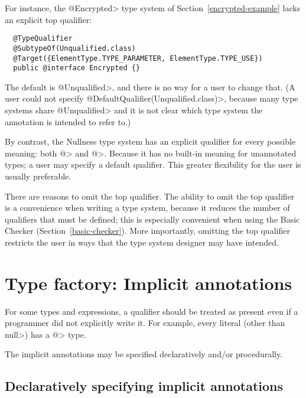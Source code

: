 For instance, the \<@Encrypted> type system of
Section~\ref{encrypted-example} lacks an explicit top qualifier:

\begin{Verbatim}
  @TypeQualifier
  @SubtypeOf(Unqualified.class)
  @Target({ElementType.TYPE_PARAMETER, ElementType.TYPE_USE})
  public @interface Encrypted {}
\end{Verbatim}


\noindent
The default is
\<@Unqualified>, and there is no way for a user to change that.
(A user could not specify \<@DefaultQualifier(Unqualified.class)>,
because many type systems share \<@Unqualified> and it is not clear which
type system the annotation is intended to refer to.)

By contrast, the Nullness type system has an explicit qualifier for every
possible meaning:  both \<@> and
\<@>.  Because it has no built-in meaning
for unannotated types; a user may specify a default qualifier.  This
greater flexibility for the user is usually preferable.

There are reasons to omit the top qualifier.
The ability to omit the top qualifier is a convenience
when writing a type system, because it reduces the number of qualifiers
that must be defined; this is especially convenient when using the Basic
Checker (Section~\ref{basic-checker}).
More importantly, omitting the top qualifier restricts the user in ways
that the type system designer may have intended.


\section{Type factory: Implicit annotations\label{writing-type-introduction}}

For some types and expressions, a qualifier should be treated as present
even if a programmer did not explicitly write it.  For example, every
literal (other than \<null>) has a \<@> type.

The implicit annotations may be specified declaratively and/or procedurally.


\subsection{Declaratively specifying implicit annotations\label{declarative-type-introduction}}


